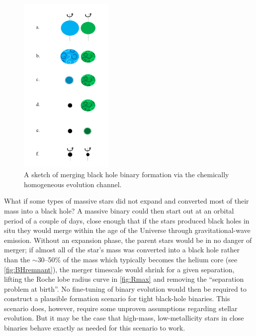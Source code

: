 \documentclass[iop,onecolumn]{revtex4}
\begin{document}
\begin{figure}
	\centering
	\includegraphics[width=0.4\textwidth]{channel2.png}
	\caption{\label{fig:chem_homog} A sketch of merging black hole binary formation via the chemically homogeneous evolution channel.}
\end{figure}

What if some types of massive stars did not expand and converted most of their mass into a black hole? A massive binary could then start out at an orbital period of a couple of days, close enough that if the stars produced black holes in situ they would merge within the age of the Universe through gravitational-wave emission. Without an expansion phase, the parent stars would be in no danger of merger; if almost all of the star's mass was converted into a black hole rather than the $\sim$30--50\% of the mass which typically becomes the helium core (see \autoref{fig:BHremnant}), the merger timescale would shrink for a given separation, lifting the Roche lobe radius curve in \autoref{fig:Rmax} and removing the ``separation problem at birth''.  No fine-tuning of binary evolution would then be required to construct a plausible formation scenario for tight black-hole binaries.  This scenario does, however, require some unproven assumptions regarding stellar evolution. But it may be the case that high-mass, low-metallicity stars in close binaries behave exactly as needed for this scenario to work.
\end{document}
